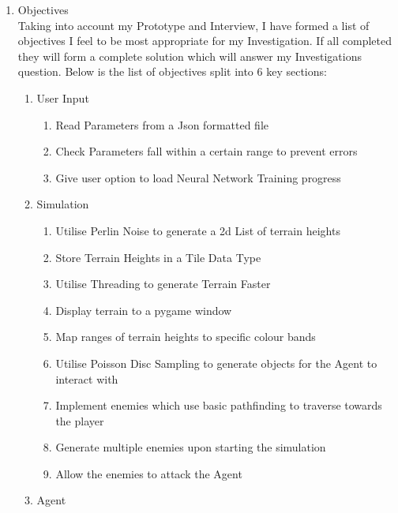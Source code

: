 \begin{flushleft}
\begin{enumerate}
            \pagebreak
        \item {\Large Objectives} \\
            \large
            Taking into account my Prototype and Interview, I have formed a list of objectives I feel to be most 
            appropriate for my Investigation.
            If all completed they will form a complete solution which will answer my Investigations question.
            Below is the list of objectives split into 6 key sections:

            \begin{enumerate}
                \item User Input
                    \begin{enumerate}
                        \item Read Parameters from a Json formatted file
                        \item Check Parameters fall within a certain range to prevent errors
                        \item Give user option to load Neural Network Training progress
                    \end{enumerate}
                \item Simulation
                    \begin{enumerate}
                        \item Utilise Perlin Noise to generate a 2d List of terrain heights
                        \item Store Terrain Heights in a Tile Data Type
                        \item Utilise Threading to generate Terrain Faster
                        \item Display terrain to a pygame window
                        \item Map ranges of terrain heights to specific colour bands
                        \item Utilise Poisson Disc Sampling to generate objects for the Agent to interact with
                        \item Implement enemies which use basic pathfinding to traverse towards the player
                        \item Generate multiple enemies upon starting the simulation
                        \item Allow the enemies to attack the Agent
                    \end{enumerate}   
                \item Agent

\end{enumerate}
\end{enumerate}
\end{flushleft}
